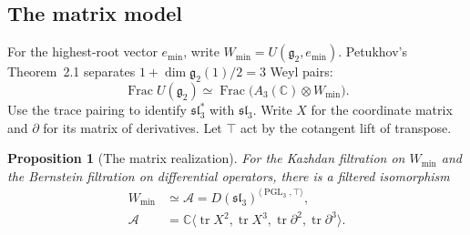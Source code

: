 \documentclass[11pt,a4paper]{article}
\newcommand{\C}{\mathbb C}
\newtheorem{proposition}[theorem]{Proposition}
\theoremstyle{definition}
\begin{document}
\subsection{The matrix model}
For the highest-root vector \(e_{\min}\), write \(W_{\min}=U(\mathfrak g_2,e_{\min})\).
Petukhov's Theorem~2.1 \cite{Petukhov} separates \(1+\dim\mathfrak g_2(1)/2=3\)
Weyl pairs:
\[
 \operatorname{Frac}U(\mathfrak g_2)\simeq
 \operatorname{Frac}\big(A_3(\mathbb C)\otimes W_{\min}\big).
\]
Use the trace pairing to identify \(\mathfrak{sl}_3^*\) with \(\mathfrak{sl}_3\). Write \(X\) for the coordinate matrix and \(\partial\) for its matrix of derivatives. Let \(\top\) act by the cotangent lift of transpose.
\begin{proposition}[The matrix realization]\label{prop:matrix}
For the Kazhdan filtration on \(W_{\min}\) and the Bernstein filtration on differential operators, there is a filtered isomorphism
\begin{equation}\label{eq:g2matrix}
 \begin{aligned}
 W_{\min}&\simeq\mathcal A =D(\mathfrak{sl}_3)^{\langle\operatorname{PGL}_3,\top\rangle},\\
 \mathcal A&=\C\langle\operatorname{tr}X^2,\operatorname{tr}X^3,
              \operatorname{tr}\partial^2,\operatorname{tr}\partial^3\rangle .
 \end{aligned}
\end{equation}
\end{proposition}
\end{document}
